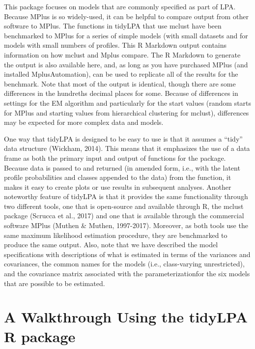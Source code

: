 \documentclass[man]{apa6}
\begin{document}
This package focuses on models that are commonly specified as part of LPA.
Because MPlus is so widely-used, it can be helpful to compare output from other
software to MPlus. The functions in tidyLPA that use mclust have been
benchmarked to MPlus for a series of simple models (with small datasets and for
models with small numbers of profiles. This R Markdown output contains
information on how mclust and Mplus compare. The R Markdown to generate the
output is also available here, and, as long as you have purchased MPlus (and
installed MplusAutomation), can be used to replicate all of the results for the
benchmark. Note that most of the output is identical, though there are some
differences in the hundreths decimal places for some. Because of differences in
settings for the EM algorithm and particularly for the start values (random
starts for MPlus and starting values from hierarchical clustering for mclust),
differences may be expected for more complex data and models.

One way that tidyLPA is designed to be easy to use is that it assumes a \enquote{tidy}
data structure (Wickham, 2014). This means that it emphasizes the use of a data
frame as both the primary input and output of functions for the package. Because
data is passed to and returned (in amended form, i.e., with the latent profile
probabilities and classes appended to the data) from the function, it makes it
easy to create plots or use results in subsequent analyses. Another noteworthy
feature of tidyLPA is that it provides the same functionality through two
different tools, one that is open-source and available through R, the mclust
package (Scrucca et al., 2017) and one that is available through the commercial
software MPlus (Muthen \& Muthen, 1997-2017). Moreover, as both tools use the
same maximum likelihood estimation procedure, they are benchmarked to produce
the same output. Also, note that we have described the model specifications with
descriptions of what is estimated in terms of the variances and covariances, the
common names for the models (i.e., class-varying unrestricted), and the
covariance matrix associated with the parameterizationfor the six models that
are possible to be estimated.

\hypertarget{a-walkthrough-using-the-tidylpa-r-package}{%
\section{A Walkthrough Using the tidyLPA R package}\label{a-walkthrough-using-the-tidylpa-r-package}}
\end{document}
